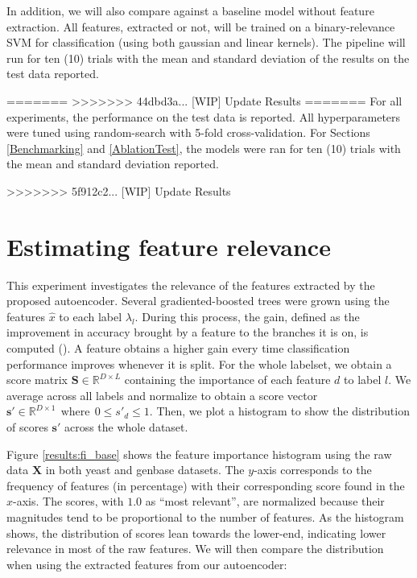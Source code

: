 \par In addition, we will also compare against a baseline model without feature
extraction. All features, extracted or not, will be trained on a
binary-relevance SVM for classification (using both gaussian and linear
kernels). The pipeline will run for ten (10) trials with the mean and
standard deviation of the results on the test data reported. 



=======
>>>>>>> 44dbd3a... [WIP] Update Results
=======
For all experiments, the performance on the test data is reported. All
hyperparameters were tuned using random-search with 5-fold cross-validation.
For Sections \ref{Benchmarking} and \ref{AblationTest}, the
models were ran for ten (10) trials with the mean and standard deviation
reported. 


>>>>>>> 5f912c2... [WIP] Update Results
\section{Estimating feature relevance}
\label{FeatureRelevance}

\par This experiment investigates the relevance of the features extracted by
the proposed autoencoder. Several gradiented-boosted trees were grown using the
features $\widehat{x}$ to each label $\lambda_l$. During this process, the
gain, defined as the improvement in accuracy brought by a feature to the
branches it is on, is computed (\cite{dmlc2015feature}). A feature obtains a
higher gain every time classification performance improves whenever it is
split. For the whole labelset, we obtain a score matrix $\mathbf{S} \in
\mathbb{R}^{D \times L}$ containing the importance of each feature $d$ to label
$l$. We average across all labels and normalize to obtain a score vector
$\mathbf{s'} \in \mathbb{R}^{D \times 1} ~~\text{where}~~ 0 \leq s'_d \leq 1$.
Then, we plot a histogram to show the distribution of scores $\mathbf{s'}$
across the whole dataset.

\par Figure \ref{results:fi_base} shows the feature importance histogram using
the raw data $\mathbf{X}$ in both yeast and genbase datasets. The $y$-axis
corresponds to the frequency of features (in percentage) with their
corresponding score found in the $x$-axis. The scores, with $1.0$ as ``most
relevant'', are normalized because their magnitudes tend to be proportional to
the number of features. As the histogram shows, the distribution of scores lean
towards the lower-end, indicating lower relevance in most of the raw features.
We will then compare the distribution when using the extracted features from
our autoencoder:

